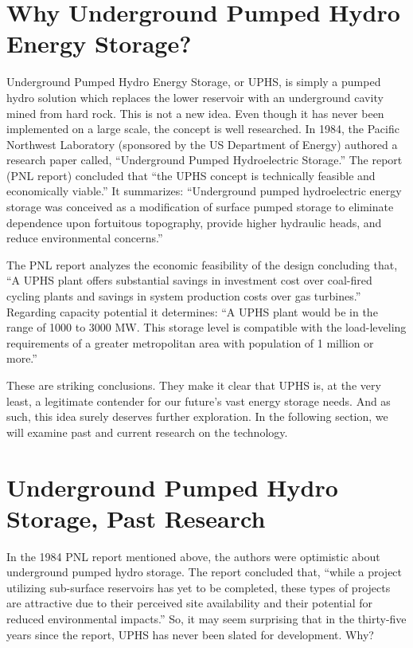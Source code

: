 \documentclass[hidelinks,12pt,a4paper]{article}
\begin{document}
\pagebreak[1]
\section{Why Underground Pumped Hydro Energy Storage?}
Underground Pumped Hydro Energy Storage, or UPHS, is simply a pumped hydro solution which replaces the lower reservoir with an underground cavity mined from hard rock. This is not a new idea. Even though it has never been implemented on a large scale, the concept is well researched. In 1984, the Pacific Northwest Laboratory (sponsored by the US Department of Energy) authored a research paper called, “Underground Pumped Hydroelectric Storage.” The report (PNL report) concluded that “the UPHS concept is technically feasible and economically viable.” \cite{UndergroundPumpedHydroelectricStorage} It summarizes: “Underground pumped hydroelectric energy storage was conceived as a modification of surface pumped storage to eliminate dependence upon fortuitous topography, provide higher hydraulic heads, and reduce environmental concerns.” \cite{UndergroundPumpedHydroelectricStorage}

The PNL report analyzes the economic feasibility of the design concluding that, “A UPHS plant offers substantial savings in investment cost over coal-fired cycling plants and savings in system production costs over gas turbines.” \cite{UndergroundPumpedHydroelectricStorage} Regarding capacity potential it determines: “A UPHS plant would be in the range of 1000 to 3000 MW. This storage level is compatible with the load-leveling requirements of a greater metropolitan area with population of 1 million or more.” \cite{SubSurfacePumpedHydroelectricStorage}

These are striking conclusions. They make it clear that UPHS is, at the very least, a legitimate contender for our future's vast energy storage needs. And as such, this idea surely deserves further exploration. In the following section, we will examine past and current research on the technology.

\pagebreak[1]
\section{Underground Pumped Hydro Storage, Past Research}
In the 1984 PNL report mentioned above, the authors were optimistic about underground pumped hydro storage. The report concluded that, “while a project utilizing sub-surface reservoirs has yet to be completed, these types of projects are attractive due to their perceived site availability and their potential for reduced environmental impacts.” \cite{SubSurfacePumpedHydroelectricStorage} So, it may seem surprising that in the thirty-five years since the report, UPHS has never been slated for development. Why?
\end{document}
